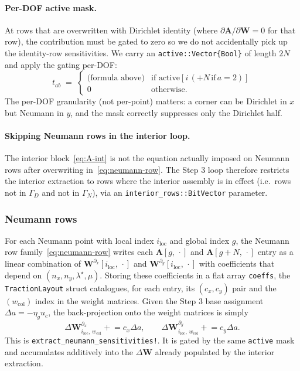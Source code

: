 \documentclass[11pt,a4paper]{article}
\newcommand{\mat}[1]{\mathbf{#1}}
\begin{document}
\paragraph{Per-DOF active mask.}
At rows that are overwritten with Dirichlet identity (where
$\partial\mat A/\partial\mat W = 0$ for that row), the
contribution must be gated to zero so we do not accidentally pick
up the identity-row sensitivities. We carry an
\texttt{active::Vector\{Bool\}} of length $2N$ and apply the
gating per-DOF:
\begin{equation}
  t_{ab} \;=\; \begin{cases}
    \text{(formula above)} & \text{if active}[i\,(+N\,\text{if}\,a{=}2)] \\
    0 & \text{otherwise}.
  \end{cases}
\end{equation}
The per-DOF granularity (not per-point) matters: a corner can be
Dirichlet in $x$ but Neumann in $y$, and the mask correctly
suppresses only the Dirichlet half.

\paragraph{Skipping Neumann rows in the interior loop.}
The interior block~\eqref{eq:A-int} is not the equation actually
imposed on Neumann rows after overwriting in~\eqref{eq:neumann-row}.
The Step 3 loop therefore restricts the interior extraction to
rows where the interior assembly is in effect (i.e.\ rows not in
$\Gamma_D$ and not in $\Gamma_N$), via an
\texttt{interior\_rows::BitVector} parameter.

\subsubsection{Neumann rows}
\label{sec:step3-neumann}

For each Neumann point with local index $i_{\text{loc}}$ and global
index $g$, the Neumann row family~\eqref{eq:neumann-row} writes each
$\mat A[g,\,\cdot]$ and $\mat A[g{+}N,\,\cdot]$ entry as a linear
combination of $\mat W^{\partial_x}[i_{\text{loc}},\,\cdot]$ and
$\mat W^{\partial_y}[i_{\text{loc}},\,\cdot]$ with coefficients
that depend on $(n_x, n_y, \lambda^\star, \mu)$. Storing these
coefficients in a flat array \texttt{coeffs}, the
\texttt{TractionLayout} struct catalogues, for each entry, its
$(c_x, c_y)$ pair and the $(w_{\text{col}})$ index in the weight
matrices. Given the Step 3 base assignment $\Delta a = -\eta_g u_c$,
the back-projection onto the weight matrices is simply
\begin{equation}
  \boxed{\;
  \Delta\mat W^{\partial_x}_{i_{\text{loc}},\, w_{\text{col}}}
    \mathrel{+}= c_x \Delta a, \qquad
  \Delta\mat W^{\partial_y}_{i_{\text{loc}},\, w_{\text{col}}}
    \mathrel{+}= c_y \Delta a.
  \;}
\end{equation}
This is \texttt{extract\_neumann\_sensitivities!}. It is gated by
the same \texttt{active} mask and accumulates additively into the
$\Delta\mat W$ already populated by the interior extraction.
\end{document}
